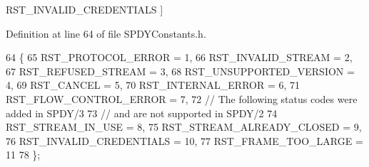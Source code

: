 \begin{Desc}
\begin{description}
{R\+S\+T\+\_\+\+I\+N\+V\+A\+L\+I\+D\+\_\+\+C\+R\+E\+D\+E\+N\+T\+I\+A\+LS\label{namespaceproxygen_1_1spdy_acad181927e2127ae4b608bbd2bed5f2fa4c0271329e0dbc5b96fbdba523278fc2}
}]\item[{\em 
R\+S\+T\+\_\+\+F\+R\+A\+M\+E\+\_\+\+T\+O\+O\+\_\+\+L\+A\+R\+GE\label{namespaceproxygen_1_1spdy_acad181927e2127ae4b608bbd2bed5f2fa45175e7d1f1cd1da380a0880bc76257f}
}]\end{description}
\end{Desc}


Definition at line 64 of file S\+P\+D\+Y\+Constants.\+h.


\begin{DoxyCode}
64                      \{
65   RST_PROTOCOL_ERROR = 1,
66   RST_INVALID_STREAM = 2,
67   RST_REFUSED_STREAM = 3,
68   RST_UNSUPPORTED_VERSION = 4,
69   RST_CANCEL = 5,
70   RST_INTERNAL_ERROR = 6,
71   RST_FLOW_CONTROL_ERROR = 7,
72   \textcolor{comment}{// The following status codes were added in SPDY/3}
73   \textcolor{comment}{// and are not supported in SPDY/2}
74   RST_STREAM_IN_USE = 8,
75   RST_STREAM_ALREADY_CLOSED = 9,
76   RST_INVALID_CREDENTIALS = 10,
77   RST_FRAME_TOO_LARGE = 11
78 \};
\end{DoxyCode}
